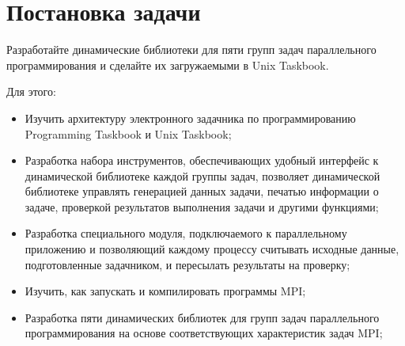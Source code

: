 \section{Постановка задачи}

Разработайте динамические библиотеки для пяти групп задач 
параллельного программирования и сделайте их загружаемыми 
в Unix Taskbook.

Для этого:

\begin{itemize}
    \item Изучить архитектуру электронного задачника по программированию Programming Taskbook и Unix Taskbook;
    \item Разработка набора инструментов, обеспечивающих удобный интерфейс к динамической библиотеке каждой группы задач, позволяет динамической библиотеке управлять генерацией данных задачи, печатью информации о задаче, проверкой результатов выполнения задачи и другими функциями;
    \item Разработка специального модуля, подключаемого к параллельному приложению и позволяющий каждому процессу считывать исходные данные, подготовленные задачником, и пересылать результаты на проверку;
    \item Изучить, как запускать и компилировать программы MPI;
    \item Разработка пяти динамических библиотек для групп задач параллельного программирования на основе соответствующих характеристик задач MPI;
\end{itemize}